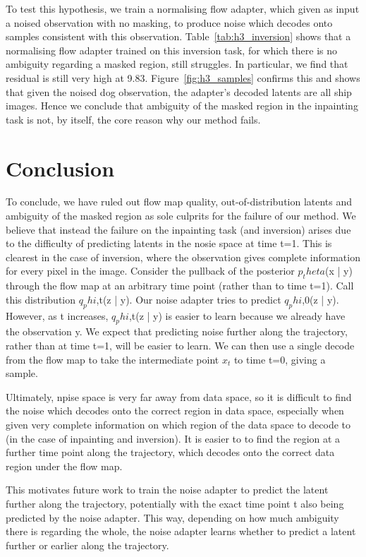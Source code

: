 \documentclass[12pt,a4paper]{report}
\begin{document}
To test this hypothesis, we train a normalising flow adapter, which given as input a noised observation with no masking, to produce noise which decodes onto samples consistent with this observation. 
Table~\ref{tab:h3_inversion} shows that a normalising flow adapter trained on this inversion task, for which there is no ambiguity regarding a masked region, still struggles. In particular, we find that residual is still very high at 9.83. 
Figure~\ref{fig:h3_samples} confirms this and shows that given the noised dog observation, the adapter's decoded latents are all ship images. 
Hence we conclude that ambiguity of the masked region in the inpainting task is not, by itself, the core reason why our method fails. 

\chapter{Conclusion}       
To conclude, we have ruled out flow map quality, out-of-distribution latents and ambiguity of the masked region as sole culprits for the failure of our method. 
We believe that instead the failure on the inpainting task (and inversion) arises due to the difficulty of predicting latents in the nosie space at time t=1. 
This is clearest in the case of inversion, where the observation gives complete information for every pixel in the image. 
Consider the pullback of the posterior $p_theta$(x | y) through the flow map at an arbitrary time point (rather than to time t=1). 
Call this distribution $q_phi$,t(z | y). 
Our noise adapter tries to predict $q_phi$,0(z | y). 
However, as t increases, $q_phi$,t(z | y) is easier to learn because we already have the observation y. 
We expect that predicting noise further along the trajectory, rather than at time t=1, will be easier to learn. 
We can then use a single decode from the flow map to take the intermediate point $x_t$ to time t=0, giving a sample. 

Ultimately, npise space is very far away from data space, so it is difficult to find the noise which decodes onto the correct region in data space, especially when given very complete information on which region of the data space to decode to (in the case of inpainting and inversion). It is easier to to find the region at a further time point along the trajectory, which decodes onto the correct data region under the flow map. 

This motivates future work to train the noise adapter to predict the latent further along the trajectory, potentially with the exact time point t also being predicted by the noise adapter. This way, depending on how much ambiguity there is regarding the whole, the noise adapter learns whether to predict a latent further or earlier along the trajectory. 
\end{document}
